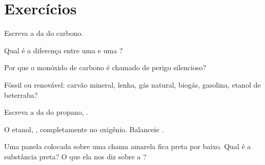 \section{Exercícios}

\begin{exercise}[$\star$]\label{exo:g8:combustion-and-fuels:1}
Escreva a  da  do carbono.
\end{exercise}

\begin{exercise}[$\star$]\label{exo:g8:combustion-and-fuels:2}
Qual é a diferença entre uma  e uma ?
\end{exercise}

\begin{exercise}[$\star$]\label{exo:g8:combustion-and-fuels:3}
Por que o monóxido de carbono é chamado de perigo silencioso?
\end{exercise}

\begin{exercise}[$\star$]\label{exo:g8:combustion-and-fuels:4}
Fóssil ou renovável: carvão mineral, lenha, gás natural, biogás,
gasolina, etanol de beterraba?
\end{exercise}

\begin{exercise}[$\star\star$]\label{exo:g8:combustion-and-fuels:5}
Escreva a  da  do propano,
.
\end{exercise}

\begin{exercise}[$\star\star$]\label{exo:g8:combustion-and-fuels:6}
O etanol, ,  completamente no oxigênio. Balanceie
. %
\end{exercise}

\begin{exercise}[$\star\star$]\label{exo:g8:combustion-and-fuels:7}
Uma panela colocada sobre uma chama amarela fica preta por baixo. Qual é
a substância preta? O que ela nos diz sobre a ?
\end{exercise}

